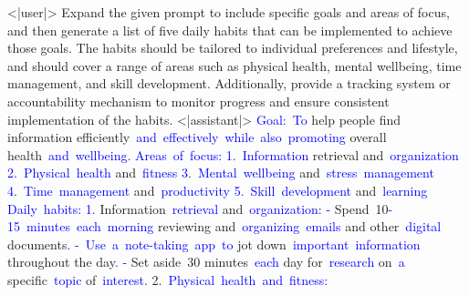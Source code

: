\documentclass{article}
\begin{document}
\begin{tcolorbox}[colframe=black,colback=white]
<|user|>
Expand the given prompt to include specific goals and areas of focus, and then generate a list of five daily habits that can be implemented to achieve those goals. The habits should be tailored to individual preferences and lifestyle, and should cover a range of areas such as physical health, mental wellbeing, time management, and skill development. Additionally, provide a tracking system or accountability mechanism to monitor progress and ensure consistent implementation of the habits.
<|assistant|>
\textcolor{blue}{Goal}\textcolor{blue}{:}\textcolor{blue}{~To} help people find information efficiently\textcolor{blue}{~and}\textcolor{blue}{~effectively}\textcolor{blue}{~while}\textcolor{blue}{~also}\textcolor{blue}{~promoting} overall health\textcolor{blue}{~and}\textcolor{blue}{~wellbeing}.
\textcolor{blue}{Areas}\textcolor{blue}{~of}\textcolor{blue}{~focus}\textcolor{blue}{:
}\textcolor{blue}{1}\textcolor{blue}{.}\textcolor{blue}{~Information} retrieval and\textcolor{blue}{~organization}\textcolor{blue}{
}\textcolor{blue}{2}\textcolor{blue}{.}\textcolor{blue}{~Physical}\textcolor{blue}{~health} and\textcolor{blue}{~fitness}\textcolor{blue}{
}\textcolor{blue}{3}.\textcolor{blue}{~Mental}\textcolor{blue}{~wellbeing} and\textcolor{blue}{~stress}\textcolor{blue}{~management}
\textcolor{blue}{4}.\textcolor{blue}{~Time}\textcolor{blue}{~management} and\textcolor{blue}{~productivity}\textcolor{blue}{
}\textcolor{blue}{5}\textcolor{blue}{.}\textcolor{blue}{~Skill}\textcolor{blue}{~development} and\textcolor{blue}{~learning}
\textcolor{blue}{Daily}\textcolor{blue}{~habits}\textcolor{blue}{:
}\textcolor{blue}{1}\textcolor{blue}{.} Information\textcolor{blue}{~retrieval} and\textcolor{blue}{~organization}:
\textcolor{blue}{-} Spend\textcolor{blue}{~}10\textcolor{blue}{-}\textcolor{blue}{15}\textcolor{blue}{~minutes}\textcolor{blue}{~each}\textcolor{blue}{~morning} reviewing and\textcolor{blue}{~organizing}\textcolor{blue}{~emails} and other\textcolor{blue}{~digital} documents\textcolor{blue}{.
}\textcolor{blue}{-}\textcolor{blue}{~Use}\textcolor{blue}{~a}\textcolor{blue}{~note}\textcolor{blue}{-taking}\textcolor{blue}{~app}\textcolor{blue}{~to} jot down\textcolor{blue}{~important}\textcolor{blue}{~information} throughout the day\textcolor{blue}{.
}\textcolor{blue}{-} Set aside\textcolor{blue}{~}30 minutes\textcolor{blue}{~each} day for\textcolor{blue}{~research} on\textcolor{blue}{~a} specific\textcolor{blue}{~topic} of\textcolor{blue}{~interest}\textcolor{blue}{.
}2.\textcolor{blue}{~Physical}\textcolor{blue}{~health}\textcolor{blue}{~and}\textcolor{blue}{~fitness}\textcolor{blue}{:
}
\end{tcolorbox}
\end{document}
